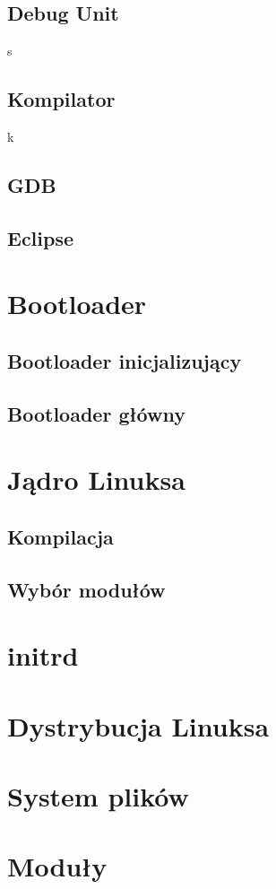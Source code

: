 \documentclass[a4paper,12pt]{book}
\begin{document}
				
				
			\subsection{Debug Unit}
				s
			\subsection{Kompilator}
				k
			\subsection{GDB}
			\subsection{Eclipse}
		\section{Bootloader}
			\subsection{Bootloader inicjalizujący}
			\subsection{Bootloader główny}
		\section{Jądro Linuksa}
			\label{sec:linux_kernel}
			\subsection{Kompilacja}
			\subsection{Wybór modułów}
		\section{initrd}
		\section{Dystrybucja Linuksa}
		\section{System plików}
		\section{Moduły}
			\label{sec:linux_modules}
\end{document}
